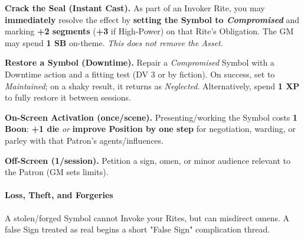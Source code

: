 \documentclass[12pt,twoside]{book}
\begin{document}
\textbf{Crack the Seal (Instant Cast).} As part of an Invoker Rite, you may \textbf{immediately} resolve the effect by \textbf{setting the Symbol to \emph{Compromised}} and marking \textbf{+2 segments} (\textbf{+3} if High-Power) on that Rite's Obligation. The GM may spend \textbf{1 SB} on-theme. \emph{This does not remove the Asset.}

\textbf{Restore a Symbol (Downtime).} Repair a \emph{Compromised} Symbol with a Downtime action and a fitting test (DV 3 or by fiction). On success, set to \emph{Maintained}; on a shaky result, it returns as \emph{Neglected}. Alternatively, spend \textbf{1 XP} to fully restore it between sessions.

\textbf{On-Screen Activation (once/scene).} Presenting/working the Symbol costs \textbf{1 Boon}: \textbf{+1 die} \emph{or} \textbf{improve Position by one step} for negotiation, warding, or parley with that Patron's agents/influences.

\textbf{Off-Screen (1/session).} Petition a sign, omen, or minor audience relevant to the Patron (GM sets limits).

\paragraph{Loss, Theft, and Forgeries}
A stolen/forged Symbol cannot Invoke your Rites, but can misdirect omens. A false Sign treated as real begins a short "False Sign" complication thread.
\end{document}
